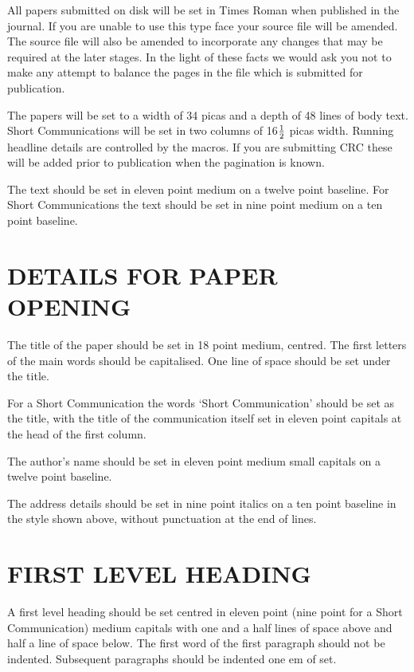 All papers submitted on disk will be set in Times Roman when
published in the journal. If you are unable to use this type face
your source file will be amended. The source file will also be
amended to incorporate any changes that may be required at the
later stages. In the light of these facts we would ask you not to
make any attempt to balance the pages in the file which is
submitted for publication.

The papers will be set to a width of 34 picas and a depth of 48
lines of body text. Short Communications will be set in two columns of
16$1\over2$ picas width. Running headline details are
controlled by the macros. If you are submitting CRC these will be
added prior to publication when the pagination is known.

The text should be set in eleven point medium on a twelve point baseline.
For Short Communications the text should be set in nine point medium on a ten
point baseline.

\section*{DETAILS FOR PAPER OPENING}

The title of the paper should be set in 18 point medium, centred.
The first letters of the main words should be capitalised.
One line of space should be set under the title.

For a Short Communication the words `Short Communication' should be set as the
title, with the title of the communication itself set in eleven point capitals
at the head of the first column.

The author's name should be set in eleven point
medium small capitals on a twelve point baseline.

The address details should be set in nine point italics on a
ten point baseline in the style shown above, without punctuation
at the end of lines.

\section*{FIRST LEVEL HEADING}

A first level heading should be set centred in eleven
point (nine point for a Short Communication) medium capitals with one and a
half lines of space above and half a line of space below.\cite{FastCom}
The first word of the first paragraph should not be indented.
Subsequent paragraphs should be indented one em of set.

